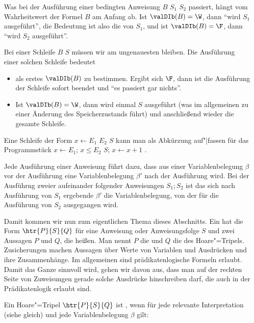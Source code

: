 Was bei der Ausführung einer bedingten Anweisung  $B$ 
$S_1$  $S_2$  passiert, hängt vom Wahrheitswert der
Formel $B$ am Anfang ab.
%
Ist $\valDIb(B)=\W$, dann "`wird $S_1$ ausgeführt"', die Bedeutung ist
also die von $S_1$, und ist $\valDIb(B)=\F$, dann "`wird $S_2$
ausgeführt"'.

Bei einer Schleife  $B$  $S$  müssen wir am
ungenauesten bleiben.
%
Die Ausführung einer solchen Schleife bedeutet
\begin{itemize}
\item als erstes $\valDIb(B)$ zu bestimmen.
  Ergibt sich $\F$, dann ist die Ausführung der Schleife sofort
  beendet und "`es passiert gar nichts"'.
\item Ist $\valDIb(B)=\W$, dann wird einmal $S$ ausgeführt (was im
  allgemeinen zu einer Änderung des Speicherzustands führt) und
  anschließend wieder die gesamte Schleife.
\end{itemize}
%
Eine Schleife der Form  $x \gets E_1$  $E_2$ 
$S$  kann man als Abkürzung auf"|fassen für das Programmstück
$x \gets E_1$;  $x\leq E_2$  $S$; $x\gets x+1$
.

Jede Ausführung einer Anweisung führt dazu, dass aus einer
Variablenbelegung $\beta$ vor der Ausführung eine Variablenbelegung
$\beta'$ nach der Ausführung wird.
%
Bei der Ausführng zweier aufeinander folgender Anweisungen $S_1;S_2$
ist das sich nach Ausführung von $S_1$ ergebende $\beta'$ die
Variablenbelegung, von der für die Ausführung von $S_2$ ausgegangen
wird.

Damit kommen wir nun zum eigentlichen Thema dieses Abschnitts.
%
Ein  hat die Form $\htr{P}{S}{Q}$
für eine Anweisung oder Anweisungsfolge $S$ und zwei Aussagen $P$ und $Q$, die
 heißen.
%
Man nennt $P$ die  und $Q$ die
 des
Hoare"=Tripels.
%
Zusicherungen machen Aussagen über Werte von Variablen und Ausdrücken und
ihre Zusammenhänge. 
%
Im allgemeinen sind prädikatenlogische Formeln erlaubt.
%
Damit das Ganze sinnvoll wird, gehen wir davon aus, dass man auf der rechten
Seite von Zuweisungen gerade solche Ausdrücke hinschreiben darf, die auch in
der Prädikatenlogik erlaubt sind.

Ein Hoare"=Tripel $\htr{P}{S}{Q}$ ist
, wenn für jede relevante Interpretation (siehe gleich)
und jede Variablenbelegung $\beta$ gilt:

